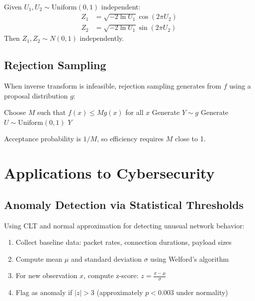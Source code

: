 \documentclass[12pt,a4paper]{article}
\begin{document}
Given $U_1, U_2 \sim \text{Uniform}(0,1)$ independent:
\begin{align}
Z_1 &= \sqrt{-2\ln U_1}\cos(2\pi U_2) \\
Z_2 &= \sqrt{-2\ln U_1}\sin(2\pi U_2)
\end{align}
Then $Z_1, Z_2 \sim N(0,1)$ independently.

\subsection{Rejection Sampling}

When inverse transform is infeasible, rejection sampling generates from $f$ using a proposal distribution $g$:

\begin{algorithm}
\caption{Rejection Sampling}
\begin{algorithmic}[1]
\State Choose $M$ such that $f(x) \leq Mg(x)$ for all $x$
\Repeat
\State Generate $Y \sim g$
\State Generate $U \sim \text{Uniform}(0,1)$
\State \Return $Y$
\end{algorithmic}
\end{algorithm}

Acceptance probability is $1/M$, so efficiency requires $M$ close to 1.

\section{Applications to Cybersecurity}

\subsection{Anomaly Detection via Statistical Thresholds}

Using CLT and normal approximation for detecting unusual network behavior:

\begin{enumerate}
\item Collect baseline data: packet rates, connection durations, payload sizes
\item Compute mean $\mu$ and standard deviation $\sigma$ using Welford's algorithm
\item For new observation $x$, compute z-score: $z = \frac{x - \mu}{\sigma}$
\item Flag as anomaly if $|z| > 3$ (approximately $p < 0.003$ under normality)
\end{enumerate}
\end{document}
